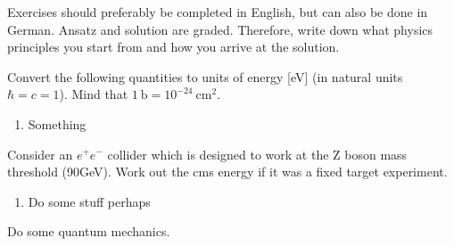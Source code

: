 \documentclass[11pt,a4paper]{article}
\begin{document}

\vspace{-5mm}

Exercises should preferably be completed in English, but can also be done in German. Ansatz and solution are graded. Therefore, write down what physics principles you start from and how you arrive at the solution.

\begin{aufgabe}[3]

Convert the following quantities to units of energy [eV] (in natural units $\hbar = c = 1$). Mind that $1~\mathrm{b} = 10^{-24}~\mathrm{cm}^{2}$.

\begin{enumerate}
\item Something 
\end{enumerate}

\end{aufgabe}

\begin{aufgabe}[10]

Consider an $e^{+}e^{-}$ collider which is designed to work at the Z boson mass threshold (90GeV). Work out the cms energy if it was a fixed target experiment.

\begin{enumerate}
\item Do some stuff perhaps

\end{enumerate}

\end{aufgabe}

\begin{aufgabe}[3]

Do some quantum mechanics.

\end{aufgabe}
\end{document}
